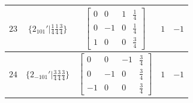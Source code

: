 \documentclass[fleqn,8pt]{jsarticle}
\begin{document}
\begin{longtable}{ccccc}
$ 23 $ & $ \{2{}_{101}{}'|\frac{1}{4} \frac{1}{4} \frac{3}{4}\} $ & $ \begin{bmatrix} 0 & 0 & 1 & \frac{1}{4} \\ 0 & -1 & 0 & \frac{1}{4} \\ 1 & 0 & 0 & \frac{3}{4} \end{bmatrix} $ & $ 1 $ & $ -1 $ \\ \hline
$ 24 $ & $ \{2{}_{-101}{}'|\frac{3}{4} \frac{3}{4} \frac{3}{4}\} $ & $ \begin{bmatrix} 0 & 0 & -1 & \frac{3}{4} \\ 0 & -1 & 0 & \frac{3}{4} \\ -1 & 0 & 0 & \frac{3}{4} \end{bmatrix} $ & $ 1 $ & $ -1 $ \\
\end{longtable}
\end{document}
